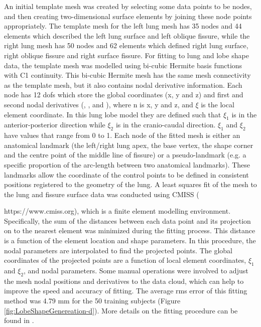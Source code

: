 An initial template mesh was created by selecting some data points to be nodes, and then creating two-dimensional surface elements by joining these node points appropriately. The template mesh for the left lung mesh has 35 nodes and 44 elements which described the left lung surface and left oblique fissure, while the right lung mesh has 50 nodes and 62 elements which defined right lung surface, right oblique fissure and right surface fissure. For fitting to lung and lobe shape data, the template mesh was modelled using bi-cubic Hermite basis functions with C1 continuity. This bi-cubic Hermite mesh has the same mesh connectivity as the template mesh, but it also contains nodal derivative information. Each node has 12 \gls{dof}s which store the global coordinates (x, y and z) and first and second nodal derivatives (, , and ), where n is x, y and z, and $\xi$ is the local element coordinate. In this lung lobe model they are defined such that $\xi_1$ is in the anterior-posterior direction while $\xi_2$ is in the cranio-caudal direction. $\xi_1$ and $\xi_2$ have values that range from 0 to 1. Each node of the fitted mesh is either an anatomical landmark (the left/right lung apex, the base vertex, the shape corner and the centre point of the middle line of fissure) or a pseudo-landmark (e.g. a specific proportion of the arc-length between two anatomical landmarks). These landmarks allow the coordinate of the control points to be defined in consistent positions registered to the geometry of the lung. A least squares fit of the mesh to the lung and fissure surface data was conducted using CMISS ({https://www.cmiss.org), which is a finite element modelling environment. Specifically, the sum of the distances between each data point and its projection on to the nearest element was minimized during the fitting process. This distance is a function of the element location and shape parameters. In this procedure, the nodal parameters are interpolated to find the projected points. The global coordinates of the projected points are a function of local element coordinates, $\xi_1$ and $\xi_2$, and nodal parameters. Some manual operations were involved to adjust the mesh nodal positions and derivatives to the data cloud, which can help to improve the speed and accuracy of fitting. The average \gls{rms} error of this fitting method was 4.79 mm for the 50 training subjects (Figure \ref{fig:LobeShapeGenereation-d}). More details on the fitting procedure can be found in  \citep{bradley1997geometric,tawhai2003developing, fernandez2004anatomically}.  


}
